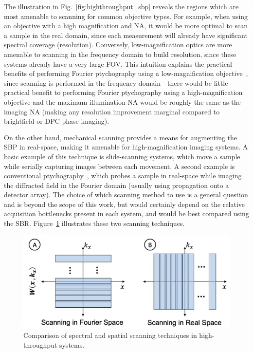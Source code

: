 The illustration in Fig.~\ref{fig:highthroughput_sbp} reveals the regions which are most amenable to scanning for common objective types. For example, when using an objective with a high magnification and NA, it would be more optimal to scan a sample in the real domain, since each measurement will already have significant spectral coverage (resolution). Conversely, low-magnification optics are more amenable to scanning in the frequency domain to build resolution, since these systems already have a very large FOV. This intuition explains the practical benefits of performing Fourier ptychography using a low-magnification objective~\cite{Zheng2013}, since scanning is performed in the frequency domain - there would be little practical benefit to performing Fourier ptychography using a high-magnification objective and the maximum illumination NA would be roughly the same as the imaging NA (making any resolution improvement marginal compared to brightfield or DPC phase imaging).

On the other hand, mechanical scanning provides a means for augmenting the SBP in real-space, making it amenable for high-magnification imaging systems. A basic example of this technique is slide-scanning systems, which move a sample while serially capturing images between each movement. A second example is conventional ptychography~\cite{rodenburg2004phase}, which probes a sample in real-space while imaging the diffracted field in the Fourier domain (usually using propagation onto a detector array). The choice of which scanning method to use is a general question and is beyond the scope of this work, but would certainly depend on the relative acquisition bottlenecks present in each system, and would be best compared using the SBR. Figure~\ref{fig:highthroughput_scanning} illustrates these two scanning techniques.

\begin{figure}
  \centering
    \includegraphics[width=\textwidth]{figures/fig_highthroughput_scanning.png}
  \caption{\label{fig:highthroughput_scanning} Comparison of spectral and spatial scanning techniques in high-throughput systems.}
\end{figure}

